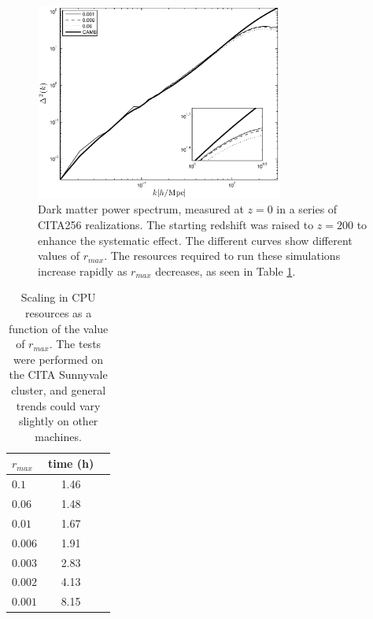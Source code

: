 \begin{figure}%
  \begin{center}
    \includegraphics[width=3.2in]{graphs/power_ra_max.eps}
  \caption{Dark matter power spectrum, measured at $z=0$ in a series of CITA256 realizations. 
 The starting redshift was raised to $z=200$ to enhance the systematic effect. The different curves show different values of $r_{max}$. 
  The resources required to run these simulations increase rapidly as $r_{max}$ decreases, as seen in Table \ref{table:ra_max}.    \label{fig:ra_max}}
\end{center}
\end{figure}

\begin{table}
\begin{center}
\caption{Scaling in {\small CPU} resources as a function of the value of $r_{max}$. The tests were performed 
on the CITA Sunnyvale cluster, and general trends could vary slightly on other machines.}
\begin{tabular}{|l|c|c|}
\hline 
$r_{max}$         & time (h)   \\                 
\hline
 $0.1$ & 1.46 \\
 $0.06$ & 1.48\\
 $0.01$ & 1.67 \\
 $0.006$ & 1.91\\
 $0.003$ & 2.83 \\
 $0.002$ & 4.13\\
 $0.001$ & 8.15\\
\hline
\end{tabular}
\label{table:ra_max}
\end{center}
\end{table}



 


